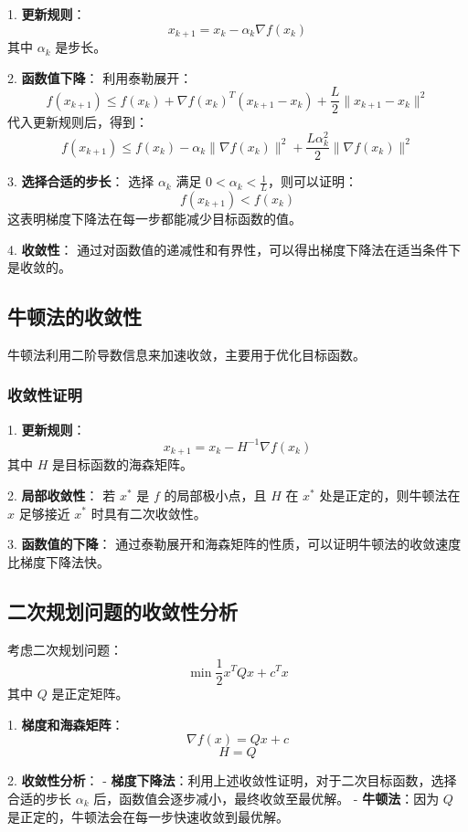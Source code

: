 \documentclass{article}
\begin{document}
    1. \textbf{更新规则}：
    \[ x_{k+1} = x_k - \alpha_k \nabla f(x_k) \]
    其中 $\alpha_k$ 是步长。

    2. \textbf{函数值下降}：
    利用泰勒展开：
   \[
   f(x_{k+1}) \leq f(x_k) + \nabla f(x_k)^T (x_{k+1} - x_k) + \frac{L}{2} \|x_{k+1} - x_k\|^2
   \]
   代入更新规则后，得到：
   \[
   f(x_{k+1}) \leq f(x_k) - \alpha_k \|\nabla f(x_k)\|^2 + \frac{L \alpha_k^2}{2} \|\nabla f(x_k)\|^2
   \]

3. \textbf{选择合适的步长}：
   选择 $\alpha_k$ 满足 $0 < \alpha_k < \frac{1}{L}$，则可以证明：
   \[
   f(x_{k+1}) < f(x_k)
   \]
   这表明梯度下降法在每一步都能减少目标函数的值。

4. \textbf{收敛性}：
   通过对函数值的递减性和有界性，可以得出梯度下降法在适当条件下是收敛的。

\subsection*{牛顿法的收敛性}

牛顿法利用二阶导数信息来加速收敛，主要用于优化目标函数。

\subsubsection*{收敛性证明}

1. \textbf{更新规则}：
   \[
   x_{k+1} = x_k - H^{-1} \nabla f(x_k)
   \]
   其中 $H$ 是目标函数的海森矩阵。

2. \textbf{局部收敛性}：
   若 $x^*$ 是 $f$ 的局部极小点，且 $H$ 在 $x^*$ 处是正定的，则牛顿法在 $x$ 足够接近 $x^*$ 时具有二次收敛性。

3. \textbf{函数值的下降}：
   通过泰勒展开和海森矩阵的性质，可以证明牛顿法的收敛速度比梯度下降法快。

\subsection*{二次规划问题的收敛性分析}

考虑二次规划问题：
\[
\min \frac{1}{2} x^T Q x + c^T x
\]
其中 $Q$ 是正定矩阵。

1. \textbf{梯度和海森矩阵}：
   \[
   \nabla f(x) = Qx + c
   \]
   \[
   H = Q
   \]

2. \textbf{收敛性分析}：
   - \textbf{梯度下降法}：利用上述收敛性证明，对于二次目标函数，选择合适的步长 $\alpha_k$ 后，函数值会逐步减小，最终收敛至最优解。
   - \textbf{牛顿法}：因为 $Q$ 是正定的，牛顿法会在每一步快速收敛到最优解。
\end{document}

